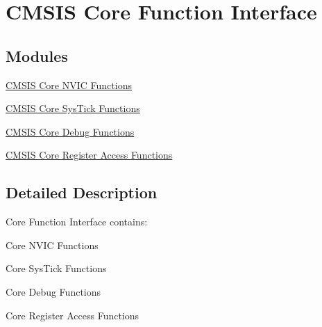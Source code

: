\hypertarget{group___c_m_s_i_s___core___function_interface}{\section{\-C\-M\-S\-I\-S \-Core \-Function \-Interface}
\label{group___c_m_s_i_s___core___function_interface}
}
\subsection*{\-Modules}
\begin{DoxyCompactItemize}
\item 
\hyperlink{group___c_m_s_i_s___core___n_v_i_c_functions}{\-C\-M\-S\-I\-S Core N\-V\-I\-C Functions}
\item 
\hyperlink{group___c_m_s_i_s___core___sys_tick_functions}{\-C\-M\-S\-I\-S Core Sys\-Tick Functions}
\item 
\hyperlink{group___c_m_s_i_s__core___debug_functions}{\-C\-M\-S\-I\-S Core Debug Functions}
\item 
\hyperlink{group___c_m_s_i_s___core___reg_acc_functions}{\-C\-M\-S\-I\-S Core Register Access Functions}
\end{DoxyCompactItemize}


\subsection{\-Detailed \-Description}
\-Core \-Function \-Interface contains\-:
\begin{DoxyItemize}
\item \-Core \-N\-V\-I\-C \-Functions
\item \-Core \-Sys\-Tick \-Functions
\item \-Core \-Debug \-Functions
\item \-Core \-Register \-Access \-Functions 
\end{DoxyItemize}